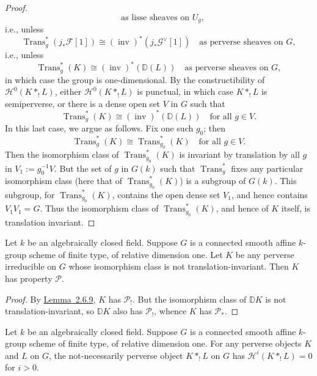 \begin{proof}
\[  \quad\text{as lisse sheaves on }U_g,
\]
i.e., unless
\[
  \operatorname{Trans}_g^*(j_*\mathcal{F}[1])
  \cong(\operatorname{inv})^*(j_*\mathcal{G}^{\vee}[1])
  \quad\text{as perverse sheaves on }G,
\]
i.e., unless
\[
  \operatorname{Trans}_g^*(K)
  \cong(\operatorname{inv})^*(\mathbb{D}(L))
  \quad\text{as perverse sheaves on }G,
\]
in which case the group is one-dimensional. By the constructibility of
\(\mathcal{H}^0(K*_!L)\), either \(\mathcal{H}^0(K*_!L)\) is punctual, in
which case \(K*_!L\) is semiperverse, or there is a dense open set \(V\) in
\(G\) such that
\[
  \operatorname{Trans}_g^*(K)\cong(\operatorname{inv})^*(\mathbb{D}(L))
  \quad\text{for all }g\in V.
\]
In this last case, we argue as follows. Fix one such \(g_0\); then
\[
  \operatorname{Trans}_g^*(K)\cong\operatorname{Trans}_{g_0}^*(K)
  \quad\text{for all }g\in V.
\]
Then the isomorphism class of \(\operatorname{Trans}_{g_0}^*(K)\) is invariant
by translation by all \(g\) in \(V_1:=g_0^{-1}V\). But the set of \(g\) in
\(G(k)\) such that \(\operatorname{Trans}_g^*\) fixes any particular
isomorphism class (here that of \(\operatorname{Trans}_{g_0}^*(K)\)) is a
subgroup of \(G(k)\). This subgroup, for \(\operatorname{Trans}_{g_0}^*(K)\),
contains the open dense set \(V_1\), and hence contains \(V_1V_1=G\). Thus the
isomorphism class of \(\operatorname{Trans}_{g_0}^*(K)\), and hence of \(K\)
itself, is translation invariant.
\end{proof}

Let \(k\) be an algebraically closed field. Suppose \(G\) is a connected smooth
affine \(k\)-group scheme of finite type, of relative dimension one. Let \(K\)
be any perverse irreducible on \(G\) whose isomorphism class is not
translation-invariant. Then \(K\) has property \(\mathcal{P}\).

\begin{proof}
By \hyperref[lem:2.6.9]{Lemma~2.6.9}, \(K\) has \(\mathcal{P}_!\). But the
isomorphism class of \(\mathbb{D}K\) is not translation-invariant, so
\(\mathbb{D}K\) also has \(\mathcal{P}_!\), whence \(K\) has
\(\mathcal{P}_*\).
\end{proof}

Let \(k\) be an algebraically closed field. Suppose \(G\) is a connected smooth
affine \(k\)-group scheme of finite type, of relative dimension one. For any
perverse objects \(K\) and \(L\) on \(G\), the not-necessarily perverse object
\(K*_!L\) on \(G\) has \(\mathcal{H}^i(K*_!L)=0\) for \(i>0\).

